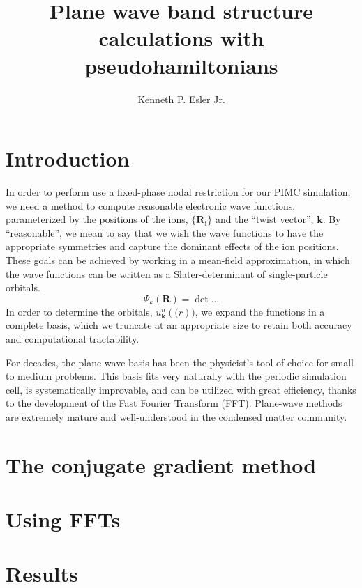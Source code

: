 \documentclass{article}
\title{Plane wave band structure calculations with pseudohamiltonians}
\author{Kenneth P. Esler Jr.}
\begin{document}
\maketitle

\section{Introduction}
In order to perform use a fixed-phase nodal restriction for our PIMC
simulation, we need a method to compute reasonable electronic wave
functions, parameterized by the positions of the ions,
$\{\mathbf{R_i}\}$ and the ``twist vector'', $\mathbf{k}$.  By
``reasonable'', we mean to say that we wish the wave functions to have
the appropriate symmetries and capture the dominant effects of the ion
positions.  These goals can be achieved by working in a mean-field
approximation, in which the wave functions can be written as a
Slater-determinant of single-particle orbitals.
\begin{equation}
\Psi_k(\mathbf{R}) = \det \dots
\end{equation}
In order to determine the orbitals, $u_\mathbf{k}^n(\mathbf(r))$, we
expand the functions in a complete basis, which we truncate at an
appropriate size to retain both accuracy and computational tractability.

For decades, the plane-wave basis has been the physicist's tool of
choice for small to medium problems.  This basis fits very naturally
with the periodic simulation cell, is systematically improvable, and
can be utilized with great efficiency, thanks to the development of
the Fast Fourier Transform (FFT).  Plane-wave methods are extremely
mature and well-understood in the condensed matter community.


\section{The conjugate gradient method}

\section{Using FFTs}

\section{Results}
\end{document}
